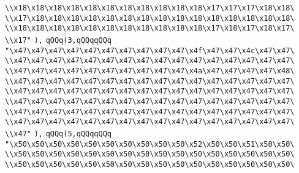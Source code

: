 \verb|\\x18\x18\x18\x18\x18\x18\x18\x18\x18\x18\x18\x17\x17\x17\x18\x18\|\newline
\verb|\\x17\x18\x18\x18\x18\x18\x18\x18\x18\x18\x18\x18\x18\x18\x18\x18\|\newline
\verb|\\x18\x18\x18\x18\x18\x18\x18\x18\x18\x18\x18\x17\x18\x17\x18\x17\|\newline
\verb|\\x17"|\newline
\verb|),|\newline
\verb|qQQq(3,qQQqqQQq|\newline
\verb|"\x47\x47\x47\x47\x47\x47\x47\x47\x47\x47\x4f\x47\x47\x4c\x47\x47\|\newline
\verb|\\x47\x47\x47\x47\x47\x47\x47\x47\x47\x47\x47\x47\x47\x47\x47\x47\|\newline
\verb|\\x47\x47\x47\x47\x47\x47\x47\x47\x47\x47\x4a\x47\x47\x47\x47\x48\|\newline
\verb|\\x47\x47\x47\x47\x47\x47\x47\x47\x47\x47\x47\x47\x47\x47\x47\x47\|\newline
\verb|\\x47\x47\x47\x47\x47\x47\x47\x47\x47\x47\x47\x47\x47\x47\x47\x47\|\newline
\verb|\\x47\x47\x47\x47\x47\x47\x47\x47\x47\x47\x47\x47\x47\x47\x47\x47\|\newline
\verb|\\x47\x47\x47\x47\x47\x47\x47\x47\x47\x47\x47\x47\x47\x47\x47\x47\|\newline
\verb|\\x47\x47\x47\x47\x47\x47\x47\x47\x47\x47\x47\x47\x47\x47\x47\x47\|\newline
\verb|\\x47"|\newline
\verb|),|\newline
\verb|qQQq(5,qQQqqQQq|\newline
\verb|"\x50\x50\x50\x50\x50\x50\x50\x50\x50\x50\x52\x50\x50\x51\x50\x50\|\newline
\verb|\\x50\x50\x50\x50\x50\x50\x50\x50\x50\x50\x50\x50\x50\x50\x50\x50\|\newline
\verb|\\x50\x50\x50\x50\x50\x50\x50\x50\x50\x50\x50\x50\x50\x50\x50\x50\|\newline
